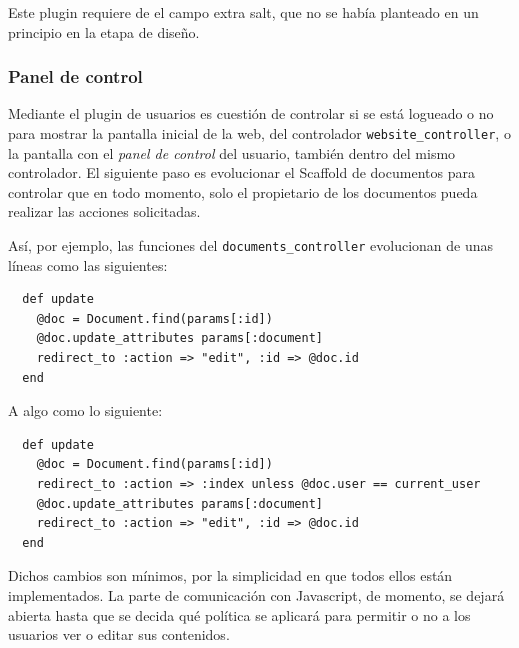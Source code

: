Este plugin requiere de el campo extra salt, que no se había planteado en un principio en la etapa de diseño.


\subsubsection{Panel de control} %
\label{ssub:panel_de_control}

Mediante el plugin de usuarios es cuestión de controlar si se está logueado o no para mostrar la pantalla inicial de la web, del controlador \texttt{website\_controller}, o la pantalla con el \emph{panel de control} del usuario, también dentro del mismo controlador. El siguiente paso es evolucionar el Scaffold de documentos para controlar que en todo momento, solo el propietario de los documentos pueda realizar las acciones solicitadas.

Así, por ejemplo, las funciones del \texttt{documents\_controller} evolucionan de unas líneas como las siguientes:

\begin{verbatim}
  def update
    @doc = Document.find(params[:id])
    @doc.update_attributes params[:document]
    redirect_to :action => "edit", :id => @doc.id
  end
\end{verbatim}

A algo como lo siguiente:

\begin{verbatim}
  def update
    @doc = Document.find(params[:id])
    redirect_to :action => :index unless @doc.user == current_user
    @doc.update_attributes params[:document]
    redirect_to :action => "edit", :id => @doc.id
  end
\end{verbatim}

Dichos cambios son mínimos, por la simplicidad en que todos ellos están implementados. La parte de comunicación con Javascript, de momento, se dejará abierta hasta que se decida qué política se aplicará para permitir o no a los usuarios ver o editar sus contenidos.



